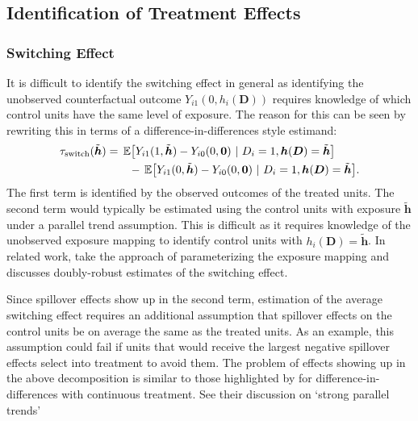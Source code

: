 \subsection{Identification of Treatment Effects}\label{sec:remove_bias}

\subsubsection{Switching Effect}

It is difficult to identify the switching effect in general as identifying the unobserved counterfactual outcome $Y_{i1}(0, h_i(\bm{D}))$ requires knowledge of which control units have the same level of exposure. The reason for this can be seen by rewriting this in terms of a difference-in-differences style estimand:
\begin{align*}
    \tau_{\text{switch}}(\tilde{\bm{h}}) &= \expec{Y_{i1}(1, \tilde{\bm{h}}) - Y_{i0}(0,\bm{0})}{D_i = 1, \bm{h}(\bm{D}) = \tilde{\bm{h}}} \\ 
    &\quad\quad - \expec{Y_{i1}(0, \tilde{\bm{h}}) - Y_{i0}(0,\bm{0})}{D_i = 1, \bm{h}(\bm{D}) = \tilde{\bm{h}} }.
\end{align*}
The first term is identified by the observed outcomes of the treated units. The second term would typically be estimated using the control units with exposure $\tilde{\bm{h}}$ under a parallel trend assumption. This is difficult as it requires knowledge of the unobserved exposure mapping to identify control units with $h_i(\bm{D}) = \tilde{\bm{h}}$. In related work, \citet{xu2023difference} take the approach of parameterizing the exposure mapping and discusses doubly-robust estimates of the switching effect.

Since spillover effects show up in the second term, estimation of the average switching effect requires an additional assumption that spillover effects on the control units be on average the same as the treated units. As an example, this assumption could fail if units that would receive the largest negative spillover effects select into treatment to avoid them. The problem of effects showing up in the above decomposition is similar to those highlighted by \citet{Callaway_Goodman-Bacon_SantAnna_2021} for difference-in-differences with continuous treatment. See their discussion on `strong parallel trends'

